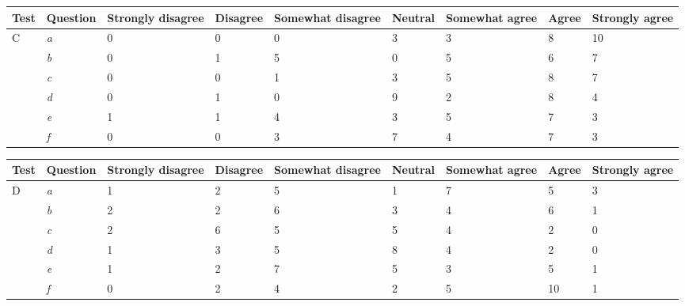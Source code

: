 \begin{center}\small \label{TestC}
	\begin{tabular}{ p{1.4cm} | p{1.4cm} | p{1.3cm} | p{1.4cm} | p{1.7cm} | p{1.2cm} | p{1.7cm} | p{0.9cm}| p{1.3cm} |}
\hline	
	\textbf{Test}	&	\textbf{Question}	&	\textbf{Strongly disagree}	&	\textbf{Disagree}	&	\textbf{Somewhat disagree}	&	\textbf{Neutral}	&	\textbf{Somewhat agree}	&	\textbf{Agree}	&	\textbf{Strongly agree}	\\ \hline
C	&	\textit{a}	&	0	&	0	&	0	&	3	&	3	&	8	&	10	\\ \hline
	&	\textit{b}	&	0	&	1	&	5	&	0	&	5	&	6	&	7	\\ \hline
	&	\textit{c}	&	0	&	0	&	1	&	3	&	5	&	8	&	7	\\ \hline
	&	\textit{d}	&	0	&	1	&	0	&	9	&	2	&	8	&	4	\\ \hline
	&	\textit{e}	&	1	&	1	&	4	&	3	&	5	&	7	&	3	\\ \hline
	&	\textit{f}	&	0	&	0	&	3	&	7	&	4	&	7	&	3	\\ \hline
	\end{tabular}
\end{center}	
\begin{center}\small \label{TestD}
	\begin{tabular}{ p{1.4cm} | p{1.4cm} | p{1.3cm} | p{1.4cm} | p{1.7cm} | p{1.2cm} | p{1.7cm} | p{0.9cm}| p{1.3cm} |}
\hline	
	\textbf{Test}	&	\textbf{Question}	&	\textbf{Strongly disagree}	&	\textbf{Disagree}	&	\textbf{Somewhat disagree}	&	\textbf{Neutral}	&	\textbf{Somewhat agree}	&	\textbf{Agree}	&	\textbf{Strongly agree}	\\ \hline
D	&	\textit{a}	&	1	&	2	&	5	&	1	&	7	&	5	&	3	\\ \hline
	&	\textit{b}	&	2	&	2	&	6	&	3	&	4	&	6	&	1	\\ \hline
	&	\textit{c}	&	2	&	6	&	5	&	5	&	4	&	2	&	0	\\ \hline
	&	\textit{d}	&	1	&	3	&	5	&	8	&	4	&	2	&	0	\\ \hline
	&	\textit{e}	&	1	&	2	&	7	&	5	&	3	&	5	&	1	\\ \hline
	&	\textit{f}	&	0	&	2	&	4	&	2	&	5	&	10	&	1	\\ \hline
	\end{tabular}
\end{center}	



